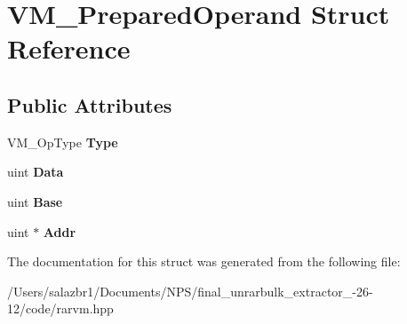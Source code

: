 \hypertarget{struct_v_m___prepared_operand}{\section{V\-M\-\_\-\-Prepared\-Operand Struct Reference}
\label{struct_v_m___prepared_operand}
}
\subsection*{Public Attributes}
\begin{DoxyCompactItemize}
\item 
\hypertarget{struct_v_m___prepared_operand_a80352e8ed7473a3d8561f8887ed40474}{V\-M\-\_\-\-Op\-Type {\bfseries Type}}\label{struct_v_m___prepared_operand_a80352e8ed7473a3d8561f8887ed40474}

\item 
\hypertarget{struct_v_m___prepared_operand_a7549a42c9592d8013cc07b74b82ddf61}{uint {\bfseries Data}}\label{struct_v_m___prepared_operand_a7549a42c9592d8013cc07b74b82ddf61}

\item 
\hypertarget{struct_v_m___prepared_operand_a019341ad00e2ea1b4a3a9510a3a59542}{uint {\bfseries Base}}\label{struct_v_m___prepared_operand_a019341ad00e2ea1b4a3a9510a3a59542}

\item 
\hypertarget{struct_v_m___prepared_operand_a63decb06e755883cf805c744993659d6}{uint $\ast$ {\bfseries Addr}}\label{struct_v_m___prepared_operand_a63decb06e755883cf805c744993659d6}

\end{DoxyCompactItemize}


The documentation for this struct was generated from the following file\-:\begin{DoxyCompactItemize}
\item 
/\-Users/salazbr1/\-Documents/\-N\-P\-S/final\-\_\-unrarbulk\-\_\-extractor\-\_-\/26-\/12/code/rarvm.\-hpp\end{DoxyCompactItemize}
